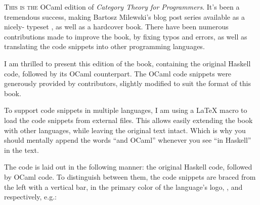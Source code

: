 
\lettrine[lhang=0.17]{T}{his is the} OCaml edition of \emph{Category Theory for Programmers}.
It's been a tremendous success, making Bartosz Milewski's blog post series available as a nicely-
typeset , as well as a hardcover book. There have been numerous contributions made
to improve the book, by fixing typos and errors, as well as translating the code snippets into
other programming languages.

I am thrilled to present this edition of the book, containing the original Haskell code, followed by
its OCaml counterpart. The OCaml code snippets were generously provided by
 contributors, slightly
modified to suit the format of this book.

To support code snippets in multiple languages, I am using a \LaTeX{} macro to load the code snippets
from external files. This allows easily extending the book with other languages, while leaving the
original text intact. Which is why you should mentally append the words ``and OCaml'' whenever you see
``in Haskell'' in the text.

The code is laid out in the following manner: the original Haskell code, followed by OCaml code.
To distinguish between them, the code snippets are braced from the left with a vertical bar, in the primary
color of the language's logo, ,
and  respectively, e.g.:

\unskip
{}
\NoIndentAfterThis
